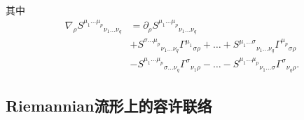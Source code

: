 \begin{definition}
\begin{equation}
			\end{equation}
			其中
			\begin{equation}
				\begin{split}
					\nabla_{\rho}{S^{\mu_1\dots\mu_p}}_{\nu_1\dots\nu_q}&=\partial_\rho{S^{\mu_1\dots\mu_p}}_{\nu_1\dots\nu_q}\\
					&+{S^{\sigma\dots\mu_p}}_{\nu_1\dots\nu_q}{\varGamma^{\mu_1}}_{\sigma\rho}+\dots+{S^{\mu_1\dots\sigma}}_{\nu_1\dots\nu_q}{\varGamma^{\mu_p}}_{\sigma\rho}\\
					&-{S^{\mu_1\dots\mu_p}}_{\sigma\dots\nu_q}{\varGamma^{\sigma}}_{\nu_1\rho}-\dots-{S^{\mu_1\dots\mu_p}}_{\nu_1\dots\sigma}{\varGamma^{\sigma}}_{\nu_q\rho}.
				\end{split}		
			\end{equation}
		\end{definition}
    \subsection{Riemannian流形上的容许联络}